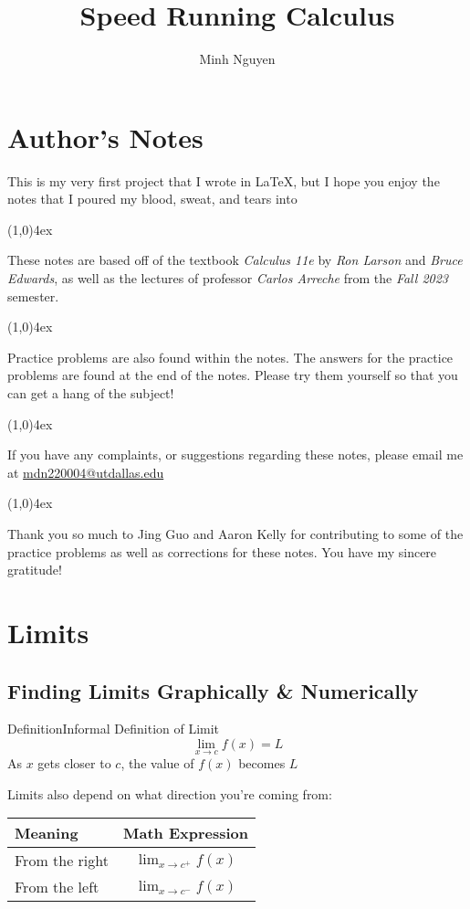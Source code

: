 \documentclass{MathNotes}
\title{Speed Running Calculus}
\author{Minh Nguyen}
\newenvironment{definition}[1]{\begin{RedBox}{Definition}{#1}}{\end{RedBox}}
\newcommand{\br}{
	\begin{center}
		\line(1,0){4ex}
	\end{center}}
\begin{document}
\newpage
\maketitle
{}
\tableofcontents
\newpage
\section*{Author's Notes}\label{sec:author-notes}
This is my very first project that I wrote in \LaTeX, but I hope you enjoy
the notes that I poured my blood, sweat, and tears into 
\br
These notes are based off of the textbook \textit{Calculus 11e} by
\textit{Ron Larson} and \textit{Bruce Edwards}, as well as the lectures of
professor \textit{Carlos Arreche} from the \textit{Fall 2023} semester.
\br
Practice problems are also found within the notes. The answers for the practice
problems are found at the end of the notes. Please try them yourself so that
you can get a hang of the subject!
\br
If you have any complaints, or suggestions regarding these notes, please
email me at \newline\href{mailto:minh.nguyen7@utdallas.edu}{mdn220004@utdallas.edu}
\br
Thank you so much to Jing Guo and Aaron Kelly for contributing to some of the
practice problems as well as corrections for these notes. You have my sincere
gratitude!
\newpage
{}

\section{Limits}\label{sec:limits}
\subsection{Finding Limits Graphically \& Numerically}
\label{sec:graphic-numeric-limits}

\begin{multicols}{2}[]
	\begin{definition}{Informal Definition of Limit}\label{def:informal-def-limit}
		\[\lim_{x\to c}f(x)=L\]
		As $x$ gets closer to $c$, the value of $f(x)$ becomes $L$
	\end{definition}

	Limits also depend on what direction you're coming from:

	\begin{tabular}{lc}\label{tab:directional-limit}
		Meaning        & Math Expression       \\
		\midrule
		From the right & $\lim_{x\to c^+}f(x)$ \\
		From the left  & $\lim_{x\to c^-}f(x)$ \\
	\end{tabular}
\end{multicols}
\end{document}
